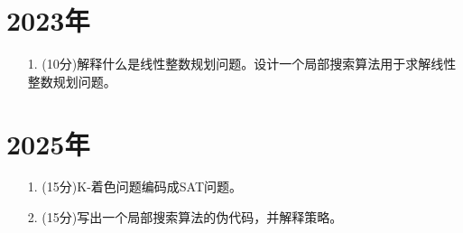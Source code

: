 \documentclass{article}
\begin{document}
\newpage
\section*{2023年}
\begin{enumerate}
    \item[1. ](10分)解释什么是线性整数规划问题。设计一个局部搜索算法用于求解线性整数规划问题。
\end{enumerate}
\newpage
\section*{2025年}
\begin{enumerate}
    \item[1. ](15分)K-着色问题编码成SAT问题。
    \item[2. ](15分)写出一个局部搜索算法的伪代码，并解释策略。
\end{enumerate}
\end{document}
